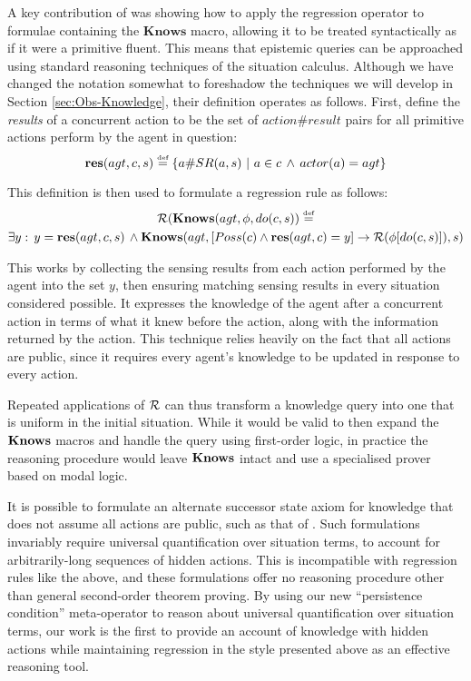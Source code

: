 A key contribution of \citet{scherl03sc_knowledge} was showing how
to apply the regression operator to formulae containing the $\mathbf{Knows}$
macro, allowing it to be treated syntactically as if it were a primitive
fluent. This means that epistemic queries can be approached using
standard reasoning techniques of the situation calculus. Although
we have changed the notation somewhat to foreshadow the techniques
we will develop in Section \ref{sec:Obs-Knowledge}, their definition
operates as follows. First, define the \emph{results} of a concurrent
action to be the set of $action\#result$ pairs for all primitive
actions perform by the agent in question:\[
\mathbf{res}(agt,c,s)\stackrel{\mbox{\tiny def}}{=}\{a\#SR(a,s)\,\,|\,\, a\in c\,\wedge\, actor(a)=agt\}\]


This definition is then used to formulate a regression rule as follows:\begin{multline}
\mathcal{R}(\mathbf{Knows}(agt,\phi,do(c,s))\stackrel{\mbox{\tiny def}}{=}\\
\exists y:\, y=\mathbf{res}(agt,c,s)\,\wedge\mathbf{Knows}(agt,\left[Poss(c)\wedge\mathbf{res}(agt,c)=y\right]\rightarrow\mathcal{R}(\phi[do(c,s)]),s)\label{eq:reg_k_std}\end{multline}


This works by collecting the sensing results from each action performed
by the agent into the set $y$, then ensuring matching sensing results
in every situation considered possible. It expresses the knowledge
of the agent after a concurrent action in terms of what it knew before
the action, along with the information returned by the action. This
technique relies heavily on the fact that all actions are public,
since it requires every agent's knowledge to be updated in response
to every action.

Repeated applications of $\mathcal{R}$ can thus transform a knowledge query
into one that is uniform in the initial situation. While it would
be valid to then expand the $\mathbf{Knows}$ macros and handle the query
using first-order logic, in practice the reasoning procedure would
leave $\mathbf{Knows}$ intact and use a specialised prover based on modal
logic.

It is possible to formulate an alternate successor state axiom for
knowledge that does not assume all actions are public, such as that
of \citet{Lesperance99sitcalc_approach}. Such formulations invariably
require universal quantification over situation terms, to account
for arbitrarily-long sequences of hidden actions. This is incompatible
with regression rules like the above, and these formulations offer
no reasoning procedure other than general second-order theorem proving.
By using our new {}``persistence condition'' meta-operator to reason
about universal quantification over situation terms, our work is the
first to provide an account of knowledge with hidden actions while
maintaining regression in the style presented above as an effective
reasoning tool.

